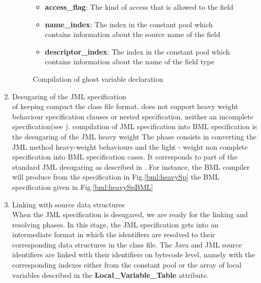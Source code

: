 \documentclass[a4paper]{llncs}
\begin{document}
\begin{enumerate}
\begin{figure}[t]
\begin{itemize}
\item \textbf{access\_flag}: The kind of access that is allowed to the field

\item \textbf{name\_index}:  The index in the constant pool which contains information about the source name of the field

\item \textbf{descriptor\_index}: The index in the constant pool which contains information about the name of the field type  
\end{itemize}


\caption{\sc Compilation of ghost variable declaration}
\label{bml:compiler:ghost}
\end{figure}

\item Desugaring of the JML specification \\
      of keeping compact the class file format.  %
      does not support heavy weight behaviour specification clauses or
      nested specification, neither an incomplete %
      specification(see \cite{JMLRefMan}).  %
      compilation of JML specification into BML specification is the
      desugaring of the JML heavy weight The phase consists in
      converting the JML method heavy-weight behaviours and the light
      - weight non complete specification into BML specification
      cases.  It corresponds to part of the standard JML desugaring as
      described in \cite{RT03djml}.  For instance, the BML compiler
      will produce from the specification in Fig.\ref{bml:heavySp} the
      BML specification given in Fig.\ref{bml:heavySpBML}
      



\item Linking with source data structures \\
      When the JML specification is desugared, we are ready for the
      linking and resolving phases.  In this stage, the JML
      specification gets into an intermediate format in which the
      identifiers are resolved to their corresponding data structures
      in the class file.  The Java and JML source identifiers are
      linked with their identifiers on bytecode level, namely with the
      corresponding indexes either from the constant pool or the array
      of local variables described in the
      \textbf{Local\_Variable\_Table} attribute.


\end{enumerate}
\end{document}
